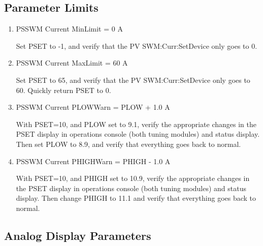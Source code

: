 \documentclass[11pt]{book}		%
\begin{document}
\subsection{Parameter Limits}

\begin{enumerate}
 \item PSSWM Current MinLimit = 0 A

\color{red}
Set PSET to -1, and verify that the PV SWM:Curr:SetDevice only goes to 0.
\color{black}

 \item PSSWM Current MaxLimit = 60 A

\color{red}
Set PSET to 65, and verify that the PV SWM:Curr:SetDevice only goes to 60. Quickly return PSET to 0.
\color{black}

 \item PSSWM Current PLOWWarn = PLOW + 1.0 A

\color{red}
With PSET=10, and PLOW set to 9.1, verify the appropriate changes in the PSET display in operations console (both tuning modules) and status display. Then set PLOW to 8.9, and verify that everything goes back to normal.
\color{black}

 \item PSSWM Current PHIGHWarn = PHIGH - 1.0 A

\color{red}
With PSET=10, and PHIGH set to 10.9, verify the appropriate changes in the PSET display in operations console (both tuning modules) and status display. Then change PHIGH to 11.1 and verify that everything goes back to normal.
\color{black}

\end{enumerate}

\subsection{Analog Display Parameters}
\end{document}
